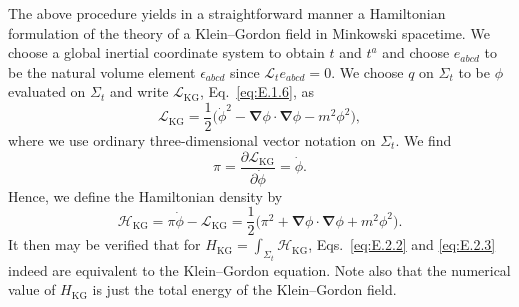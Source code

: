 The above procedure yields in a straightforward manner a Hamiltonian formulation
of the theory of a Klein--Gordon field in Minkowski spacetime. We choose a global
inertial coordinate system to obtain \(t\) and \(t^a\) and choose \(e_{abcd}\) to be
the natural volume element \(\epsilon_{abcd}\) since
\(\mathcal L_t e_{abcd}=0\). We choose \(q\) on \(\Sigma_t\) to be \(\phi\)
evaluated on \(\Sigma_t\) and write \(\mathcal L_{\mathrm{KG}}\),
Eq.~\eqref{eq:E.1.6}, as
\begin{equation}
  \mathcal L_{\mathrm{KG}}
    =\frac{1}{2}\bigl(\dot\phi^2-\boldsymbol{\nabla}\phi\cdot\boldsymbol{\nabla}\phi
      -m^2\phi^2\bigr),
  \tag{E.2.8}\label{eq:E.2.8}
\end{equation}
where we use ordinary three-dimensional vector notation on \(\Sigma_t\). We find
\begin{equation}
  \pi=\frac{\partial\mathcal L_{\mathrm{KG}}}{\partial\dot\phi}=\dot\phi.
  \tag{E.2.9}\label{eq:E.2.9}
\end{equation}
Hence, we define the Hamiltonian density by
\begin{equation}
  \mathcal H_{\mathrm{KG}}
    =\pi\dot\phi-\mathcal L_{\mathrm{KG}}
    =\frac{1}{2}\bigl(\pi^2+\boldsymbol{\nabla}\phi\cdot\boldsymbol{\nabla}\phi+m^2\phi^2\bigr).
  \tag{E.2.10}\label{eq:E.2.10}
\end{equation}
It then may be verified that for
\(H_{\mathrm{KG}}=\int_{\Sigma_t}\mathcal H_{\mathrm{KG}}\),
Eqs.~\eqref{eq:E.2.2} and \eqref{eq:E.2.3} indeed are equivalent to the
Klein--Gordon equation. Note also that the numerical value of \(H_{\mathrm{KG}}\)
is just the total energy of the Klein--Gordon field.


